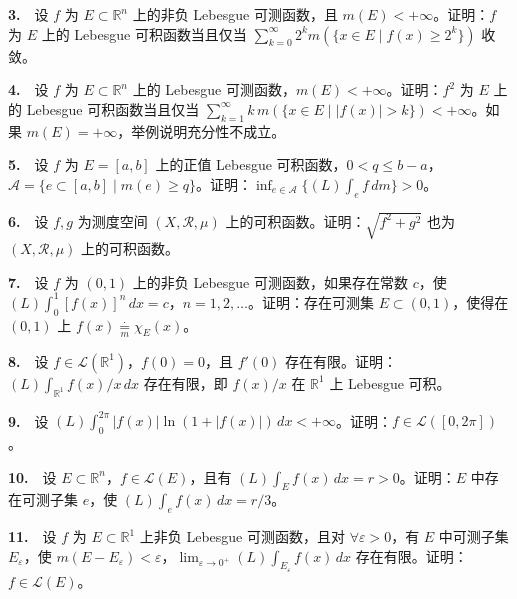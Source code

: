 \documentclass[11pt,a4paper]{article}
\begin{document}
\par{}\noindent \textbf{3.}　设 \(f\) 为 \(E\subset\mathbb R^n\) 上的非负 Lebesgue 可测函数，且 \(m(E)<+\infty\)。证明：\(f\) 为 \(E\) 上的 Lebesgue 可积函数当且仅当 \(\sum_{k=0}^\infty 2^k m(\{x\in E\mid f(x)\ge 2^k\})\) 收敛。

\par{}\noindent \textbf{4.}　设 \(f\) 为 \(E\subset\mathbb R^n\) 上的 Lebesgue 可测函数，\(m(E)<+\infty\)。证明：\(f^2\) 为 \(E\) 上的 Lebesgue 可积函数当且仅当 \(\sum_{k=1}^\infty k\,m(\{x\in E\mid |f(x)|>k\})<+\infty\)。如果 \(m(E)=+\infty\)，举例说明充分性不成立。

\par{}\noindent \textbf{5.}　设 \(f\) 为 \(E=[a,b]\) 上的正值 Lebesgue 可积函数，\(0<q\le b-a\)，\(\mathcal A=\{e\subset[a,b]\mid m(e)\ge q\}\)。证明：\(\inf_{e\in\mathcal A}\{(L)\int_e f\,dm\}>0\)。

\par{}\noindent \textbf{6.}　设 \(f,g\) 为测度空间 \((X,\mathcal R,\mu)\) 上的可积函数。证明：\(\sqrt{f^2+g^2}\) 也为 \((X,\mathcal R,\mu)\) 上的可积函数。

\par{}\noindent \textbf{7.}　设 \(f\) 为 \((0,1)\) 上的非负 Lebesgue 可测函数，如果存在常数 \(c\)，使 \((L)\int_0^1[f(x)]^n\,dx=c\)，\(n=1,2,\ldots\)。证明：存在可测集 \(E\subset(0,1)\)，使得在 \((0,1)\) 上 \(f(x)\underset{m}{\overset{\cdot}{=}}\chi_E(x)\)。

\par{}\noindent \textbf{8.}　设 \(f\in\mathcal L(\mathbb R^1)\)，\(f(0)=0\)，且 \(f'(0)\) 存在有限。证明：\((L)\int_{\mathbb R^1}f(x)/x\,dx\) 存在有限，即 \(f(x)/x\) 在 \(\mathbb R^1\) 上 Lebesgue 可积。

\par{}\noindent \textbf{9.}　设 \((L)\int_0^{2\pi}|f(x)|\ln(1+|f(x)|)\,dx<+\infty\)。证明：\(f\in\mathcal L([0,2\pi])\)。

\par{}\noindent \textbf{10.}　设 \(E\subset\mathbb R^n\)，\(f\in\mathcal L(E)\)，且有 \((L)\int_E f(x)\,dx=r>0\)。证明：\(E\) 中存在可测子集 \(e\)，使 \((L)\int_e f(x)\,dx=r/3\)。

\par{}\noindent \textbf{11.}　设 \(f\) 为 \(E\subset\mathbb R^1\) 上非负 Lebesgue 可测函数，且对 \(\forall\varepsilon>0\)，有 \(E\) 中可测子集 \(E_\varepsilon\)，使 \(m(E-E_\varepsilon)<\varepsilon\)，\(\lim_{\varepsilon\to0^+}(L)\int_{E_\varepsilon} f(x)\,dx\) 存在有限。证明：\(f\in\mathcal L(E)\)。
\end{document}
